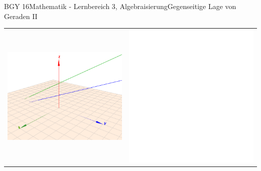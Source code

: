 \documentclass[oneside,openany,headings=optiontotoc,11pt,numbers=noenddot]{scrreprt}
\begin{document}
\begin{worksheet}{BGY 16}{Mathematik - Lernbereich 3, Algebraisierung}{Gegenseitige Lage von Geraden II}
\begin{framed}
\begin{center}
\begin{tabularx}{\textwidth}{Xr}
					\includegraphics[scale=0.45]{Bilder/ghParallel3D.png} & \includegraphics[scale=0.36]{../empty.jpg}
				\end{tabularx}
			\end{center}
		\end{framed}
	\end{worksheet}
\end{document}
